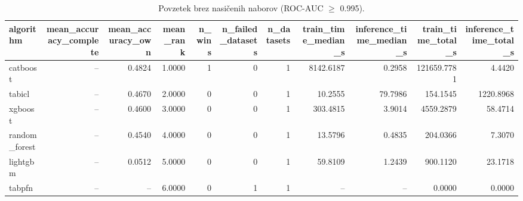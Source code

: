 \begin{table}[htbp]
\centering
\caption{Povzetek brez nasičenih naborov (ROC-AUC $\geq$ 0.995).}
\label{tab:overall-nonsat}
\begin{tabular}{lrrrrrrrrrr}
\hline
algorithm & mean\_accuracy\_complete & mean\_accuracy\_own & mean\_rank & n\_wins & n\_failed\_datasets & n\_datasets & train\_time\_median\_s & inference\_time\_median\_s & train\_time\_total\_s & inference\_time\_total\_s \\
\hline
catboost & -- & 0.4824 & 1.0000 & 1 & 0 & 1 & 8142.6187 & 0.2958 & 121659.7781 & 4.4420 \\
tabicl & -- & 0.4670 & 2.0000 & 0 & 0 & 1 & 10.2555 & 79.7986 & 154.1545 & 1220.8968 \\
xgboost & -- & 0.4600 & 3.0000 & 0 & 0 & 1 & 303.4815 & 3.9014 & 4559.2879 & 58.4714 \\
random\_forest & -- & 0.4540 & 4.0000 & 0 & 0 & 1 & 13.5796 & 0.4835 & 204.0366 & 7.3070 \\
lightgbm & -- & 0.0512 & 5.0000 & 0 & 0 & 1 & 59.8109 & 1.2439 & 900.1120 & 23.1718 \\
tabpfn & -- & -- & 6.0000 & 0 & 1 & 1 & -- & -- & 0.0000 & 0.0000 \\
\hline
\end{tabular}
\end{table}
